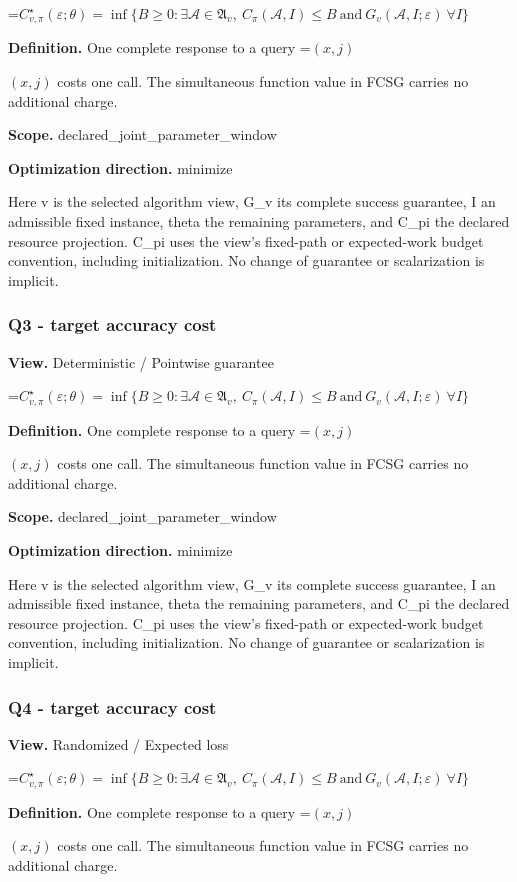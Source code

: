 \documentclass[10pt,a4paper]{article}
\newcommand{\AtlasMath}[1]{\par\begingroup\centering\setbox0=\hbox{$\displaystyle #1$}\ifdim\wd0>1.4\linewidth\typeout{ATLAS WIDE FORMULA: \the\wd0}\fi\ifdim\wd0>\linewidth\resizebox{\linewidth}{!}{\box0}\else\box0\fi\par\endgroup}
\newcommand{\AtlasInlineMath}[1]{\begingroup\setbox0=\hbox{$#1$}\ifdim\wd0>.4\linewidth\endgroup\AtlasMath{#1}\else\endgroup$#1$\fi}
\begin{document}
\AtlasMath{C^\star_{v,\pi}(\varepsilon;\theta)=\inf\{B\ge0:\exists\mathcal A\in\mathfrak A_v,\ C_\pi(\mathcal A,I)\le B\ \text{and}\ G_v(\mathcal A,I;\varepsilon)\ \forall I\}}
\textbf{Definition.} One complete response to a query \AtlasInlineMath{(x,j)} costs one call. The simultaneous function value in FCSG carries no additional charge.

\textbf{Scope.} declared\_joint\_parameter\_window

\textbf{Optimization direction.} minimize

Here v is the selected algorithm view, G\_v its complete success guarantee, I an admissible fixed instance, theta the remaining parameters, and C\_pi the declared resource projection. C\_pi uses the view's fixed-path or expected-work budget convention, including initialization. No change of guarantee or scalarization is implicit.

\subsubsection{Q3 - target accuracy cost}
\textbf{View.} Deterministic / Pointwise guarantee

\AtlasMath{C^\star_{v,\pi}(\varepsilon;\theta)=\inf\{B\ge0:\exists\mathcal A\in\mathfrak A_v,\ C_\pi(\mathcal A,I)\le B\ \text{and}\ G_v(\mathcal A,I;\varepsilon)\ \forall I\}}
\textbf{Definition.} One complete response to a query \AtlasInlineMath{(x,j)} costs one call. The simultaneous function value in FCSG carries no additional charge.

\textbf{Scope.} declared\_joint\_parameter\_window

\textbf{Optimization direction.} minimize

Here v is the selected algorithm view, G\_v its complete success guarantee, I an admissible fixed instance, theta the remaining parameters, and C\_pi the declared resource projection. C\_pi uses the view's fixed-path or expected-work budget convention, including initialization. No change of guarantee or scalarization is implicit.

\subsubsection{Q4 - target accuracy cost}
\textbf{View.} Randomized / Expected loss

\AtlasMath{C^\star_{v,\pi}(\varepsilon;\theta)=\inf\{B\ge0:\exists\mathcal A\in\mathfrak A_v,\ C_\pi(\mathcal A,I)\le B\ \text{and}\ G_v(\mathcal A,I;\varepsilon)\ \forall I\}}
\textbf{Definition.} One complete response to a query \AtlasInlineMath{(x,j)} costs one call. The simultaneous function value in FCSG carries no additional charge.
\end{document}
